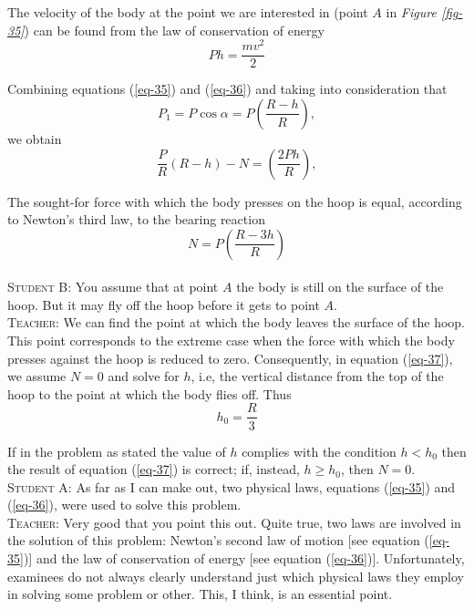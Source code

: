\documentclass[a4paper,sfsidenotes]{tufte-book}
\begin{document}
The velocity of the body at the point we are interested in (point $A$ in \emph{Figure \ref{fig-35}}) can be found from the law of conservation of energy
\begin{equation}
Ph = \frac{mv^{2}}{2}
\label{eq-36}
\end{equation}

Combining equations (\ref{eq-35}) and (\ref{eq-36}) and taking into consideration that
\begin{equation*}
P_{1}=P \cos \alpha = P \left(\frac{R-h}{R}\right),
\end{equation*}
 we obtain
\begin{equation*}
\frac{P}{R} \left( R-h \right) - N = \left(\frac{2Ph}{R}\right),
\end{equation*}

The sought-for force with which the body presses on the hoop is equal, according to Newton's third law, to the bearing reaction
\begin{equation}
N=P \left( \frac{R-3h}{R} \right)
\label{eq-37}
\end{equation}
\\
\textsc{Student B:} You assume that at point $A$ the body is still on the surface of the hoop. But it may fly off the hoop before it gets to point $A$.
\\
\textsc{Teacher:} We can find the point at which the body leaves the surface of the hoop. This point corresponds to the extreme case when the force with which the body presses against the
hoop is reduced to zero. Consequently, in equation (\ref{eq-37}), we assume $N=0$ and solve for $h$, i.e, the vertical distance from the top of the hoop to the point at which the body flies off.
Thus
\begin{equation}
h_{0} = \frac{R}{3}
\label{eq-38}
\end{equation}

If in the problem as stated the value of $h$ complies with the condition $h < h_{0}$ then the result of equation (\ref{eq-37}) is correct; if, instead, $h\geqslant h_{0}$, then $N=0$.
\\
\textsc{Student A:} As far as I can make out, two physical laws, equations (\ref{eq-35}) and (\ref{eq-36}), were used to solve this problem.
\\
\textsc{Teacher:} Very good that you point this out. Quite true, two laws are involved in the solution of this problem: Newton's second law of motion [see equation (\ref{eq-35})] and the law of conservation of energy  [see equation (\ref{eq-36})]. Unfortunately, examinees do not always clearly understand just which physical laws they employ in solving some problem or other. This, I think, is an essential point.
\end{document}
